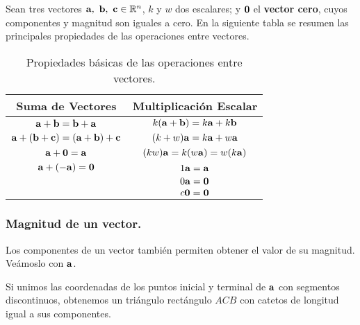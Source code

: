 \documentclass[12pt]{article}
\begin{document}
Sean tres vectores $\vecmat{a}, \ \vecmat{b}, \ \vecmat{c} \in \R^{n}$, $k$ y $w$ dos escalares; y $\mathbf{0}$ el \textbf{vector cero}, cuyos componentes y magnitud son iguales a cero. En la siguiente tabla se resumen las principales propiedades de las operaciones entre vectores.

\begin{table}[hbt!]
\centering

\begin{tabular}{c|c}
Suma de Vectores & Multiplicación Escalar \\
\hline
$\mathbf{a} + \mathbf{b} = \mathbf{b} + \mathbf{a}$ & $k(\mathbf{a} + \mathbf{b}) = k\mathbf{a} + k\mathbf{b}$ \\
$\mathbf{a} + (\mathbf{b} + \mathbf{c}) = (\mathbf{a} + \mathbf{b}) + \mathbf{c}$ & $(k + w)\mathbf{a} = k\mathbf{a} + w\mathbf{a}$ \\
$\mathbf{a} + \mathbf{0} = \mathbf{a}$ & $(kw) \mathbf{a} = k(w\mathbf{a}) = w(k\mathbf{a})$ \\
$\mathbf{a} + (-\mathbf{a}) = \mathbf{0}$ & $1\mathbf{a} = \mathbf{a}$ \\
 & $0\mathbf{a} = \mathbf{0}$ \\
 & $c\mathbf{0} = \mathbf{0}$
\end{tabular}

\caption{Propiedades básicas de las operaciones entre vectores.}

\end{table}

\subsubsection{Magnitud de un vector.}

Los componentes de un vector también permiten obtener el valor de su magnitud. Veámoslo con $\mathbf{a}$.

Si unimos las coordenadas de los puntos inicial y terminal de $\mathbf{a}$ con segmentos discontinuos, obtenemos un triángulo rectángulo $ACB$ con catetos de longitud igual a sus componentes.
\end{document}
